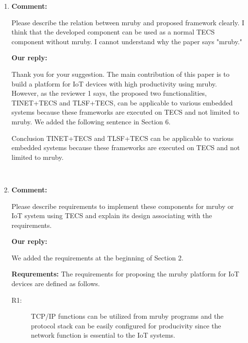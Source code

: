 \documentclass{article}
\begin{document}
\begin{enumerate}

\item \begin{flushleft}
\textbf{Comment:}

Please describe the relation between mruby and proposed framework clearly. I think that the developed component can be used as a normal TECS component without mruby. I cannot understand why the paper says "mruby." 
\end{flushleft}

\begin{flushleft}
\textbf{Our reply:}

Thank you for your suggestion.
The main contribution of this paper is to build a platform for IoT devices with high productivity using mruby.
However, as the reviewer 1 says, the proposed two functionalities, TINET+TECS and TLSF+TECS, can be applicable to various embedded systems because these frameworks are executed on TECS and not limited to mruby.
We added the following sentence in Section 6.

\begin{itembox}[|]{Conclusion}
TINET+TECS and TLSF+TECS can be applicable to various embedded systems because these frameworks are executed on TECS and not limited to mruby.
\end{itembox}\\

\end{flushleft}


\item \begin{flushleft}
\textbf{Comment:}

Please describe requirements to implement these components for mruby or IoT system using TECS and explain its design associating with the requirements. 
\end{flushleft}

\begin{flushleft}
\textbf{Our reply:}

We added the requirements at the beginning of Section 2.
\begin{itembox}[|]{}
{\bf Requrements:} The requirements for proposing the mruby platform for IoT devices are defined as follows.
\begin{description}
    \item[R1:]
        TCP/IP functions can be utilized from mruby programs and the protocol stack can be easily configured for producivity since the network function is essential to the IoT systems.


\end{description}
\end{itembox}
\end{flushleft}
\end{enumerate}
\end{document}
